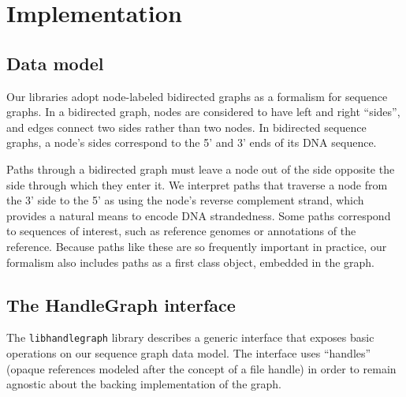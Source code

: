 \documentclass{article}
\begin{document}



\section{Implementation}

\subsection{Data model}

Our libraries adopt node-labeled bidirected graphs as a formalism for sequence graphs.
In a bidirected graph, nodes are considered to have left and right ``sides'', and edges connect two sides rather than two nodes.
In bidirected sequence graphs, a node's sides correspond to the 5' and 3' ends of its DNA sequence. 

Paths through a bidirected graph must leave a node out of the side opposite the side through which they enter it.
We interpret paths that traverse a node from the 3' side to the 5' as using the node's reverse complement strand, which provides a natural means to encode DNA strandedness.
Some paths correspond to sequences of interest, such as reference genomes or annotations of the reference.
Because paths like these are so frequently important in practice, our formalism also includes paths as a first class object, embedded in the graph.

\subsection{The HandleGraph interface}

The \texttt{libhandlegraph} library describes a generic interface that exposes basic operations on our sequence graph data model.
The interface uses ``handles'' (opaque references modeled after the concept of a file handle) in order to remain agnostic about the backing implementation of the graph.
\end{document}
